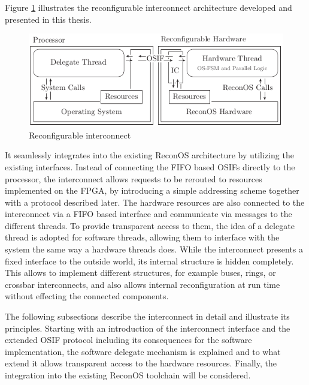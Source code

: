 Figure \ref{fig:interconnect} illustrates the reconfigurable interconnect
architecture developed and presented in this thesis.
\begin{figure}[tb]
	\centering
	\includegraphics[width=12cm]{../figures/interconnect}
	\caption{Reconfigurable interconnect}
	\label{fig:interconnect}
\end{figure}
It seamlessly integrates into the existing ReconOS architecture by utilizing
the existing interfaces. Instead of connecting the \ac{FIFO} based \acp{OSIF}
directly to the processor, the interconnect allows requests to be rerouted to
resources implemented on the \ac{FPGA}, by introducing a simple addressing
scheme together with a protocol described later. The hardware resources are
also connected to the interconnect via a \ac{FIFO} based interface and
communicate via messages to the different threads. To provide transparent
access to them, the idea of a delegate thread is adopted for software threads,
allowing them to interface with the system the same way a hardware threads
does. While the interconnect presents a fixed interface to the outside world,
its internal structure is hidden completely. This allows to implement
different structures, for example buses, rings, or crossbar interconnects, and
also allows internal reconfiguration at run time without effecting the
connected components.

The following subsections describe the interconnect in detail and illustrate
its principles. Starting with an introduction of the interconnect interface
and the extended \ac{OSIF} protocol including its consequences for the
software implementation, the software delegate mechanism is explained and to
what extend it allows transparent access to the hardware resources. Finally,
the integration into the existing ReconOS toolchain will be considered.

